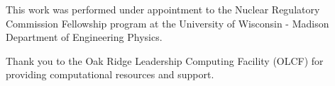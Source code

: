 This work was performed under appointment to the Nuclear Regulatory
Commission Fellowship program at the University of Wisconsin - Madison
Department of Engineering Physics. 

Thank you to the Oak Ridge Leadership Computing Facility (OLCF) for
providing computational resources and support.
